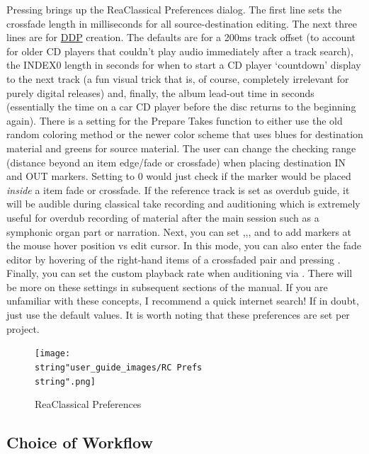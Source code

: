 \documentclass[10pt,american]{article}
\begin{document}
Pressing  brings up the ReaClassical Preferences dialog. The first line
sets the crossfade length in milliseconds for all source-destination editing.
The next three lines are for
\href{https://en.wikipedia.org/wiki/Disc_Description_Protocol}{DDP} creation.
The defaults are for a 200ms track offset (to account for older CD players that
couldn't play audio immediately after a track search), the INDEX0 length in
seconds for when to start a CD player `countdown' display to the next track (a
fun visual trick that is, of course, completely irrelevant for purely digital
releases) and, finally, the album lead-out time in seconds (essentially the time
on a car CD player before the disc returns to the beginning again). There is a
setting for the Prepare Takes function to either use the old random coloring
method or the newer color scheme that uses blues for destination material and
greens for source material. The user can change the checking range (distance
beyond an item edge/fade or crossfade) when placing destination IN and OUT
markers. Setting to 0 would just check if the marker would be placed
\emph{inside} a item fade or crossfade. If the reference track is set as overdub
guide, it will be audible during classical take recording and auditioning which
is extremely useful for overdub recording of material after the main session
such as a symphonic organ part or narration. Next, you can set
,,, and  to add markers at the mouse hover
position vs edit cursor. In this mode, you can also enter the fade editor by
hovering of the right-hand items of a crossfaded pair and pressing .
Finally, you can set the custom playback rate when auditioning via
. There will be more on these settings in subsequent sections of
the manual. If you are unfamiliar with these concepts, I recommend a quick
internet search! If in doubt, just use the default values. It is worth noting
that these preferences are set per project.

\begin{figure}
\begin{centering}
\texttt{[image: \\string"user\_guide\_images/RC Prefs\\string".png]}
\par\end{centering}
\caption{ReaClassical Preferences}
\end{figure}


\subsection{Choice of Workflow}
\end{document}
